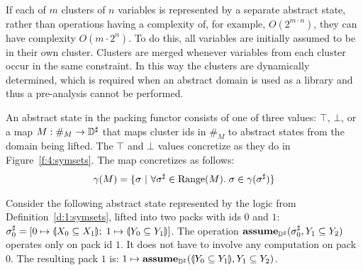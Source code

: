If each of $m$ clusters of $n$ variables is represented by a separate abstract state, rather than operations having a complexity of, for example, $O(2^{m\cdot n})$, they can have complexity $O(m\cdot 2^n)$.  To do this, all variables are initially assumed to be in their own cluster.  Clusters are merged whenever variables from each cluster occur in the same constraint.  In this way the clusters are dynamically determined, which is required when an abstract domain is used as a library and thus a pre-analysis cannot be performed.

An abstract state in the packing functor consists of one of three values: $\top$, $\bot$, or a map $M : \#_M \rightarrow {\mathbb{D}}^{\sharp}$ that maps cluster ids in $\#_M$ to abstract states from the domain being lifted.  The $\top$ and $\bot$ values concretize as they do in Figure~\ref{f:4:symsets}.  The map concretizes as follows:
\begin{align*}
  \gamma(M) = \{ \sigma \ | \ \forall {\sigma}^{\sharp} \in \textrm{Range}(M). \; \sigma \in \gamma({\sigma}^{\sharp}) \}
\end{align*}

\begin{example}
Consider the following abstract state represented by the logic from Definition~\ref{d:1:symsets}, lifted into two packs with ids $0$ and $1$:
$
  {\sigma}^{\sharp}_0 = [0 \mapsto \llparenthesis X_0 \subseteq X_1 \rrparenthesis; \; 1 \mapsto \llparenthesis Y_0 \subseteq Y_1 \rrparenthesis ]
$.
The operation $\textbf{assume}_{{\mathbb{D}}^{\sharp}}({\sigma}^{\sharp}_0, Y_1 \subseteq Y_2)$ operates only on pack id $1$.  It does not have to involve any computation on pack $0$.  The resulting pack $1$ is: $1 \mapsto \textbf{assume}_{{\mathbb{D}}^{\sharp}}(\llparenthesis Y_0 \subseteq Y_1 \rrparenthesis, Y_1 \subseteq Y_2)$.
\end{example}
